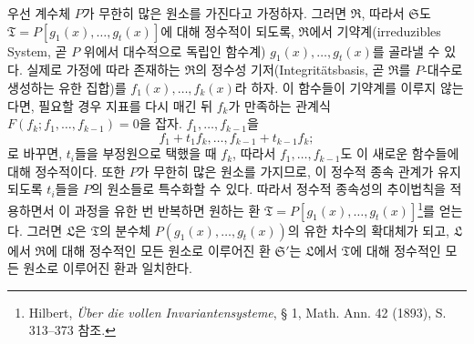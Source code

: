 \documentclass[11pt]{article}
\begin{document}
우선 계수체 $P$가 무한히 많은 원소를 가진다고 가정하자. 그러면 $\mathfrak R$, 따라서 $\mathfrak S$도 $\mathfrak T=P[g_1(x),\ldots,g_t(x)]$에 대해 정수적이 되도록, $\mathfrak R$에서 기약계(irreduzibles System, 곧 $P$ 위에서 대수적으로 독립인 함수계) $g_1(x),\ldots,g_t(x)$를 골라낼 수 있다. 실제로 가정에 따라 존재하는 $\mathfrak R$의 정수성 기저(Integritätsbasis, 곧 $\mathfrak R$를 $P$-대수로 생성하는 유한 집합)를 $f_1(x),\ldots,f_k(x)$라 하자. 이 함수들이 기약계를 이루지 않는다면, 필요할 경우 지표를 다시 매긴 뒤 $f_k$가 만족하는 관계식 $F(f_k;f_1,\ldots,f_{k-1})=0$을 잡자. $f_1,\ldots,f_{k-1}$을
\[
 f_1+t_1f_k,\ldots,f_{k-1}+t_{k-1}f_k;
\]
로 바꾸면, $t_i$들을 부정원으로 택했을 때 $f_k$, 따라서 $f_1,\ldots,f_{k-1}$도 이 새로운 함수들에 대해 정수적이다. 또한 $P$가 무한히 많은 원소를 가지므로, 이 정수적 종속 관계가 유지되도록 $t_i$들을 $P$의 원소들로 특수화할 수 있다. 따라서 정수적 종속성의 추이법칙을 적용하면서 이 과정을 유한 번 반복하면 원하는 환 $\mathfrak T=P[g_1(x),\ldots,g_t(x)]$\footnote{Hilbert, \emph{Über die vollen Invariantensysteme}, § 1, Math. Ann. 42 (1893), S. 313--373 참조.}를 얻는다. 그러면 $\mathfrak L$은 $\mathfrak T$의 분수체 $P(g_1(x),\ldots,g_t(x))$의 유한 차수의 확대체가 되고, $\mathfrak L$에서 $\mathfrak R$에 대해 정수적인 모든 원소로 이루어진 환 $\mathfrak S'$는 $\mathfrak L$에서 $\mathfrak T$에 대해 정수적인 모든 원소로 이루어진 환과 일치한다.
\end{document}
